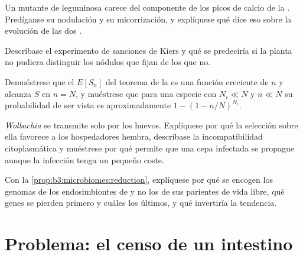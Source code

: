 \begin{exercise}[$\star\star$]\label{exo:b3:microbiomes:8}
Un mutante de leguminosa carece del componente de los picos de calcio de
la . Predíganse su nodulación y su
micorrización, y explíquese qué dice eso sobre la evolución de las dos
.
\end{exercise}

\begin{exercise}[$\star\star$]\label{exo:b3:microbiomes:9}
Descríbase el experimento de sanciones de Kiers y qué se predeciría si la
planta no pudiera distinguir los nódulos que fijan de los que no.
\end{exercise}

\begin{exercise}[$\star\star\star$]\label{exo:b3:microbiomes:10}
Demuéstrese que el $E[S_{n}]$ del teorema de la  es una
función creciente de $n$ y alcanza $S$ en $n = N$, y muéstrese que para
una especie con $N_{i} \ll N$ y $n \ll N$ su probabilidad de ser vista es
aproximadamente $1 - (1 - n/N)^{N_{i}}$.
\end{exercise}

\begin{exercise}[$\star\star\star$]\label{exo:b3:microbiomes:11}
\emph{Wolbachia} se transmite solo por los huevos. Explíquese por qué la
selección sobre ella favorece a los hospedadores hembra, descríbase la
incompatibilidad citoplasmática y muéstrese por qué permite que una cepa
infectada se propague aunque la infección tenga un pequeño coste.
\end{exercise}

\begin{exercise}[$\star\star\star$]\label{exo:b3:microbiomes:12}
Con la \cref{prop:b3:microbiomes:reduction}, explíquese por qué se encogen
los genomas de los endosimbiontes de  y no los de sus
parientes de vida libre, qué genes se pierden primero y cuáles los
últimos, y qué invertiría la tendencia.
\end{exercise}

\section{Problema: el censo de un intestino}

